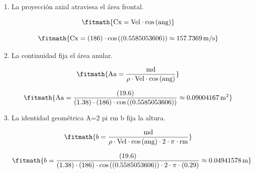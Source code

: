 \begin{enumerate}

\item La proyección axial atraviesa el área frontal.

\[\fitmath{\mathrm{Cx}=\mathrm{Vel}\cdot \cos\left(\mathrm{ang}\right)}\]

\[\fitmath{\mathrm{Cx}=(186)\cdot \cos\left((0.5585053606)\right)\approx 157.7369\,\mathrm{m/s}}\]

\item La continuidad fija el área anular.

\[\fitmath{\mathrm{Aa}=\frac{\mathrm{md}}{\rho\cdot \mathrm{Vel}\cdot \cos\left(\mathrm{ang}\right)}}\]

\[\fitmath{\mathrm{Aa}=\frac{(19.6)}{(1.38)\cdot (186)\cdot \cos\left((0.5585053606)\right)}\approx 0.09004167\,\mathrm{m^{2}}}\]

\item La identidad geométrica A=2 pi rm b fija la altura.

\[\fitmath{b=\frac{\mathrm{md}}{\rho\cdot \mathrm{Vel}\cdot \cos\left(\mathrm{ang}\right)\cdot 2\cdot \pi\cdot \mathrm{rm}}}\]

\[\fitmath{b=\frac{(19.6)}{(1.38)\cdot (186)\cdot \cos\left((0.5585053606)\right)\cdot 2\cdot \pi\cdot (0.29)}\approx 0.04941578\,\mathrm{m}}\]

\end{enumerate}
